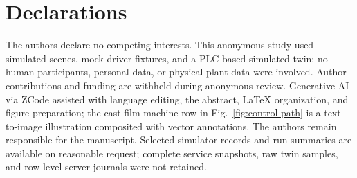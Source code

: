 \documentclass[journal]{IEEEtran}
\begin{document}
\IEEEpeerreviewmaketitle









\section*{Declarations}
The authors declare no competing interests. This anonymous study used simulated scenes, mock-driver fixtures, and a PLC-based simulated twin; no human participants, personal data, or physical-plant data were involved. Author contributions and funding are withheld during anonymous review. Generative AI via ZCode assisted with language editing, the abstract, LaTeX organization, and figure preparation; the cast-film machine row in Fig.~\ref{fig:control-path} is a text-to-image illustration composited with vector annotations. The authors remain responsible for the manuscript. Selected simulator records and run summaries are available on reasonable request; complete service snapshots, raw twin samples, and row-level server journals were not retained.



\end{document}
